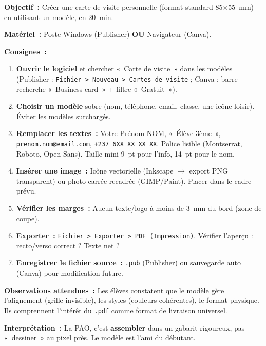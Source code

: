 \documentclass[11pt]{article}
\begin{document}
\begin{experience}
\textbf{Objectif~:} Créer une carte de visite personnelle (format standard 85$\times$55~mm) en utilisant un modèle, en 20~min.

\textbf{Matériel~:} Poste Windows (Publisher) \textbf{OU} Navigateur (Canva).

\textbf{Consignes~:}
\begin{enumerate}
    \item \textbf{Ouvrir le logiciel} et chercher «~Carte de visite~» dans les modèles (Publisher : \texttt{Fichier > Nouveau > Cartes de visite} ; Canva : barre recherche «~Business card~» + filtre «~Gratuit~»).
    \item \textbf{Choisir un modèle} sobre (nom, téléphone, email, classe, une icône loisir). Éviter les modèles surchargés.
    \item \textbf{Remplacer les textes~:} Votre Prénom NOM, «~Élève 3ème~», \texttt{prenom.nom@email.com}, \texttt{+237 6XX XX XX XX}. Police lisible (Montserrat, Roboto, Open Sans). Taille mini 9~pt pour l'info, 14~pt pour le nom.
    \item \textbf{Insérer une image~:} Icône vectorielle (Inkscape $\rightarrow$ export PNG transparent) ou photo carrée recadrée (GIMP/Paint). Placer dans le cadre prévu.
    \item \textbf{Vérifier les marges~:} Aucun texte/logo à moins de 3~mm du bord (zone de coupe).
    \item \textbf{Exporter~:} \texttt{Fichier > Exporter > PDF (Impression)}. Vérifier l'aperçu : recto/verso correct ? Texte net ?
    \item \textbf{Enregistrer le fichier source~:} \texttt{.pub} (Publisher) ou sauvegarde auto (Canva) pour modification future.
\end{enumerate}

\textbf{Observations attendues~:} Les élèves constatent que le modèle gère l'alignement (grille invisible), les styles (couleurs cohérentes), le format physique. Ils comprennent l'intérêt du \texttt{.pdf} comme format de livraison universel.

\textbf{Interprétation~:} La PAO, c'est \textbf{assembler} dans un gabarit rigoureux, pas «~dessiner~» au pixel près. Le modèle est l'ami du débutant.
\end{experience}
\end{document}
